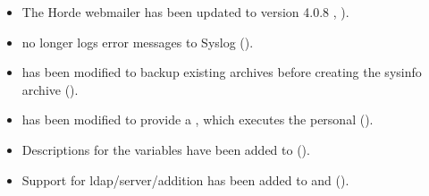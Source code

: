 \begin{itemize}
\item The Horde webmailer has been updated to version 4.0.8
, ).

\item {} no longer logs error messages to Syslog
().

\item {} has been modified to backup
existing archives before creating the sysinfo archive ().

\item {} has been modified to provide a ,
which executes the personal  ().

\item Descriptions for the \ucsUCR{} variables have been added to
 ().

\item Support for ldap/server/addition has been added to
 and
 ().

\end{itemize}

